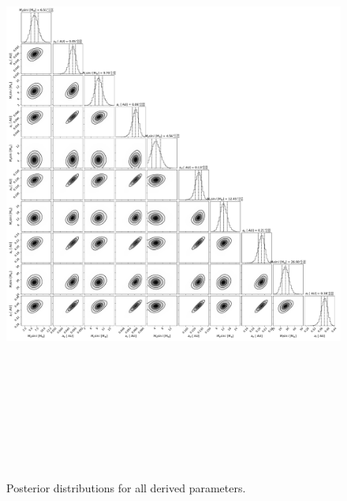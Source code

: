 \documentclass{emulateapj}
\begin{document}
\begin{figure}[!h]
\centering

\includegraphics[height=8.0in,width=6.0in,keepaspectratio]{TOI-1246_default_corner_derived_pars.pdf}
\caption{Posterior distributions for all derived parameters.}
\end{figure} 

\end{document}
